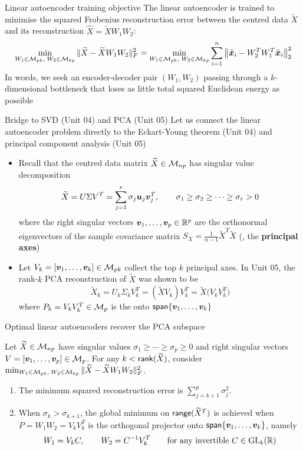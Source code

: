 \documentclass[aspectratio=169]{beamer}\usepackage[]{graphicx}\usepackage[]{xcolor}
\begin{document}
\begin{frame}{Linear autoencoder training objective}
The linear autoencoder is trained to minimise the squared Frobenius reconstruction error between the centred data $\widetilde{X}$ and its reconstruction $\hat{X} = \widetilde{X} W_1 W_2$:
\vfill
\[
\min_{W_1 \in \mathcal{M}_{pk},\; W_2 \in \mathcal{M}_{kp}} \|\widetilde{X} - \widetilde{X} W_1 W_2\|_F^2
= \min_{W_1 \in \mathcal{M}_{pk},\; W_2 \in \mathcal{M}_{kp}} \sum_{i=1}^n \big\|\tilde{\bm{x}}_i - W_2^T W_1^T \tilde{\bm{x}}_i\big\|_2^2
\]
\vfill
In words, we seek an encoder-decoder pair $(W_1, W_2)$ passing through a $k$-dimensional bottleneck that loses as little total squared Euclidean energy as possible
\end{frame}


\begin{frame}{Bridge to SVD (Unit 04) and PCA (Unit 05)}
Let us connect the linear autoencoder problem directly to the Eckart-Young theorem (Unit 04) and principal component analysis (Unit 05)
\vfill
\begin{itemize}
\item Recall that the centred data matrix $\widetilde{X} \in \mathcal{M}_{np}$ has singular value decomposition
\[
\widetilde{X} = U \Sigma V^T = \sum_{j=1}^r \sigma_j \bm{u}_j \bm{v}_j^T, \qquad \sigma_1 \ge \sigma_2 \ge \cdots \ge \sigma_r > 0
\]
where the right singular vectors $\bm{v}_1, \ldots, \bm{v}_p \in \mathbb{R}^p$ are the orthonormal eigenvectors of the sample covariance matrix $S_X = \frac{1}{n-1} \widetilde{X}^T \widetilde{X}$ (\ie, the \textbf{principal axes})
\vfill
\item Let $V_k = [\bm{v}_1, \ldots, \bm{v}_k] \in \mathcal{M}_{pk}$ collect the top $k$ principal axes. In Unit 05, the rank-$k$ PCA reconstruction of $\widetilde{X}$ was shown to be
\[
\widetilde{X}_k = U_k \Sigma_k V_k^T = (\widetilde{X} V_k) V_k^T = \widetilde{X} \big(V_k V_k^T\big)
\]
where $P_k = V_k V_k^T \in \mathcal{M}_p$ is the  onto $\mathsf{span}\{\bm{v}_1, \ldots, \bm{v}_k\}$
\end{itemize}
\end{frame}


\begin{frame}{Optimal linear autoencoders recover the PCA subspace}
\begin{importanttheorem}
\label{th:baldi-hornik}
Let $\widetilde{X} \in \mathcal{M}_{np}$ have singular values $\sigma_1 \ge \cdots \ge \sigma_p \ge 0$ and right singular vectors $V = [\bm{v}_1, \ldots, \bm{v}_p] \in \mathcal{M}_p$.
For any $k < \mathsf{rank}(\widetilde{X})$, consider $\min_{W_1 \in \mathcal{M}_{pk},\; W_2 \in \mathcal{M}_{kp}} \|\widetilde{X} - \widetilde{X} W_1 W_2\|_F^2$.
\begin{enumerate}
\item The minimum squared reconstruction error is $\sum_{j=k+1}^p \sigma_j^2$.
\item When $\sigma_k > \sigma_{k+1}$, the global minimum on $\mathsf{range}(\widetilde{X}^T)$ is achieved when $P = W_1 W_2 = V_k V_k^T$ is the orthogonal projector onto $\mathsf{span}\{\bm{v}_1, \ldots, \bm{v}_k\}$, namely
\[
W_1 = V_k C, \qquad W_2 = C^{-1} V_k^T \qquad \text{for any invertible } C \in \operatorname{GL}_k(\mathbb{R})
\]
\end{enumerate}
\end{importanttheorem}
\end{frame}
\end{document}
